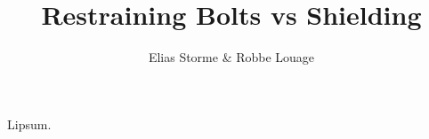 \documentclass[a4paper]{article}
\title{Restraining Bolts vs Shielding}
\author{Elias Storme \& Robbe Louage}
\begin{document}
\maketitle
Lipsum.
\end{document}
